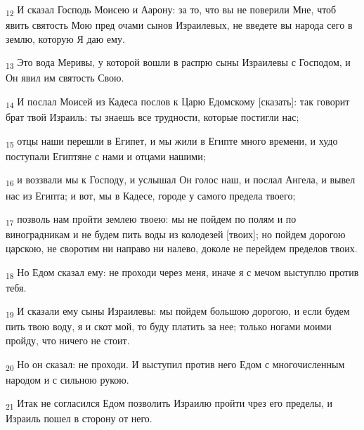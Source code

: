 \begin{tcolorbox}
\textsubscript{12} И сказал Господь Моисею и Аарону: за то, что вы не поверили Мне, чтоб явить святость Мою пред очами сынов Израилевых, не введете вы народа сего в землю, которую Я даю ему.
\end{tcolorbox}
\begin{tcolorbox}
\textsubscript{13} Это вода Меривы, у которой вошли в распрю сыны Израилевы с Господом, и Он явил им святость Свою.
\end{tcolorbox}
\begin{tcolorbox}
\textsubscript{14} И послал Моисей из Кадеса послов к Царю Едомскому [сказать]: так говорит брат твой Израиль: ты знаешь все трудности, которые постигли нас;
\end{tcolorbox}
\begin{tcolorbox}
\textsubscript{15} отцы наши перешли в Египет, и мы жили в Египте много времени, и худо поступали Египтяне с нами и отцами нашими;
\end{tcolorbox}
\begin{tcolorbox}
\textsubscript{16} и воззвали мы к Господу, и услышал Он голос наш, и послал Ангела, и вывел нас из Египта; и вот, мы в Кадесе, городе у самого предела твоего;
\end{tcolorbox}
\begin{tcolorbox}
\textsubscript{17} позволь нам пройти землею твоею: мы не пойдем по полям и по виноградникам и не будем пить воды из колодезей [твоих]; но пойдем дорогою царскою, не своротим ни направо ни налево, доколе не перейдем пределов твоих.
\end{tcolorbox}
\begin{tcolorbox}
\textsubscript{18} Но Едом сказал ему: не проходи через меня, иначе я с мечом выступлю против тебя.
\end{tcolorbox}
\begin{tcolorbox}
\textsubscript{19} И сказали ему сыны Израилевы: мы пойдем большою дорогою, и если будем пить твою воду, я и скот мой, то буду платить за нее; только ногами моими пройду, что ничего не стоит.
\end{tcolorbox}
\begin{tcolorbox}
\textsubscript{20} Но он сказал: не проходи. И выступил против него Едом с многочисленным народом и с сильною рукою.
\end{tcolorbox}
\begin{tcolorbox}
\textsubscript{21} Итак не согласился Едом позволить Израилю пройти чрез его пределы, и Израиль пошел в сторону от него.
\end{tcolorbox}
